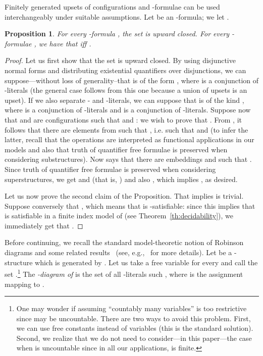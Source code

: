 \documentclass{LMCS}
\theoremstyle{plain}\newtheorem{assumption}[thm]{Assumption}
\theoremstyle{plain}\newtheorem{proposition}[thm]{Proposition}
\theoremstyle{plain}\newtheorem{property}[thm]{Property}
\theoremstyle{plain}\newtheorem{example}[thm]{Example}
\theoremstyle{plain}\newtheorem{claim}[thm]{Claim}
\theoremstyle{plain}\newtheorem{lemma}[thm]{Lemma}
\begin{document}
Finitely generated upsets of configurations and -formulae
can be used interchangeably under suitable assumptions.  Let  be
an -formula; we let .
\begin{proposition}
  \label{prop:conf}
  For every -formula , the set  is
  upward closed.  For every -formulae , we have
  that  iff .
\end{proposition}
\begin{proof}
  Let us first show that the set  is upward closed. By
  using disjunctive normal forms and distributing existential
  quantifiers over disjunctions, we can suppose---without loss of
  generality--that  is of the form , where  is a conjunction of -literals (the general case follows from this one because a
  union of upsets is an upset). If we also separate - and
  -literals, we can suppose that  is of
  the kind , where  is a
  conjunction of -literals and  is a conjunction of
  -literals. Suppose now that  and  are
  configurations such that  and : we wish to
  prove that . From , it follows
  that there are elements  from  such that
  , i.e. such that
   and  (to infer
  the latter, recall that the operations  are interpreted as
  functional applications in our models and also that truth of
  quantifier free formulae is preserved when considering
  substructures). Now  says that there are embeddings
   and  such
  that . Since truth of quantifier free
  formulae is preserved when considering superstructures, we get
   and 
  (that is, ) and also , which implies
  , as desired.

  Let us now prove the second claim of the Proposition. That
   implies  is trivial. Suppose conversely that
  , which means that  is -satisfiable: since this implies that
   is satisfiable in a finite index model of
   (see Theorem~\ref{th:decidability}), we immediately get that
  .
\end{proof}
Before continuing, we recall the standard model-theoretic notion of
Robinson diagrams and some related results~ (see, e.g.,~\cite{CK} for
more details).  Let  be a -structure which is
generated by . Let us take a free variable  for
every  and call  the set .\footnote{One may wonder if assuming ``countably many variables'' is too
  restrictive since  may be uncountable.  There are two ways to
  avoid this problem.  First, we can use free constants instead of
  variables (this is the standard solution).  Second, we realize that
  we do not need to consider---in this paper---the case when  is
  uncountable since in all our applications,  is finite.} The
\emph{-diagram  of } is the set of all
-literals  such , where  is the assignment mapping  to .
\end{document}
